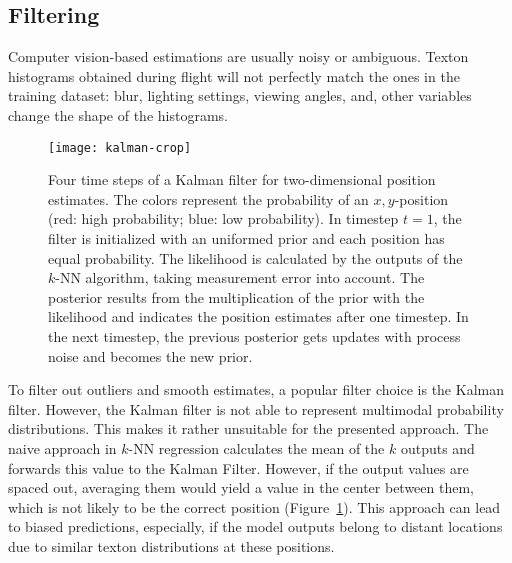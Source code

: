 \subsection{Filtering}
\label{sec:filtering}

Computer vision-based estimations are usually noisy or
ambiguous. Texton histograms obtained during flight will not perfectly
match the ones in the training dataset: blur, lighting settings,
viewing angles, and, other variables change the shape of the
histograms.

\begin{figure}[t]
\begin{center}
\texttt{[image: kalman-crop]}
\caption[Kalman Filter.]{{\label{fig:kali} Four time steps of a Kalman
    filter for two-dimensional position estimates. The colors
    represent the probability of an $x,y$-position (red: high
    probability; blue: low probability). In timestep $t = 1$, the
    filter is initialized with an uniformed prior and each position
    has equal probability. The likelihood is calculated by the outputs
    of the $k$-NN algorithm, taking measurement error into
    account. The posterior results from the multiplication of the
    prior with the likelihood and indicates the position estimates
    after one timestep. In the next timestep, the previous posterior
    gets updates with process noise and becomes the new prior.}}
\end{center}
\end{figure}

To filter out outliers and smooth estimates, a popular filter choice
is the Kalman filter. However, the Kalman filter is not able to
represent multimodal probability distributions. This makes it rather
unsuitable for the presented approach. The naive approach in $k$-NN
regression calculates the mean of the $k$ outputs and forwards this
value to the Kalman Filter. However, if the output values are spaced
out, averaging them would yield a value in the center between them,
which is not likely to be the correct position
(Figure~\ref{fig:kali}). This approach can lead to biased
predictions, especially, if the model outputs belong to distant
locations due to similar texton distributions at these positions.



